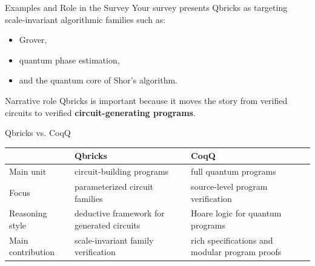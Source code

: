 \documentclass[aspectratio=169]{beamer}
\begin{document}
\begin{frame}{Examples and Role in the Survey}
\justifying
Your survey presents Qbricks as targeting scale-invariant algorithmic families such as:
\begin{itemize}
    \item Grover,
    \item quantum phase estimation,
    \item and the quantum core of Shor's algorithm.
\end{itemize}

\vspace{0.7em}
\begin{block}{Narrative role}
Qbricks is important because it moves the story
from verified circuits to verified \textbf{circuit-generating programs}.
\end{block}
\end{frame}
\begin{frame}{Qbricks vs. CoqQ}
\centering
\renewcommand{\arraystretch}{1.35}
\begin{tabular}{>{\raggedright\arraybackslash}p{3.2cm} >{\raggedright\arraybackslash}p{3.8cm} >{\raggedright\arraybackslash}p{3.8cm}}
\toprule
 & \textbf{Qbricks} & \textbf{CoqQ} \\
\midrule
Main unit & circuit-building programs & full quantum programs \\
Focus & parameterized circuit families & source-level program verification \\
Reasoning style & deductive framework for generated circuits & Hoare logic for quantum programs \\
Main contribution & scale-invariant family verification & rich specifications and modular program proofs \\
\bottomrule
\end{tabular}
\end{frame}
\end{document}
